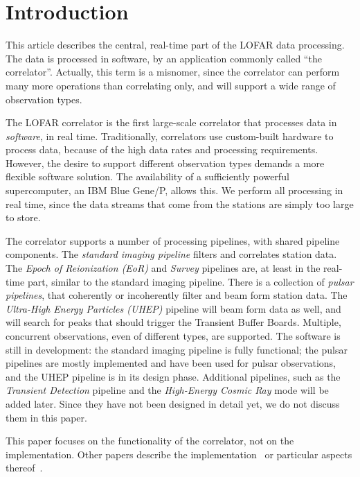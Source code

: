 \section{Introduction}

This article describes the central, real-time part of the LOFAR data
processing.
The data is processed in software, by an application commonly called
``the correlator''.
Actually, this term is a misnomer, since the correlator can perform many
more operations than correlating only, and will support a wide range of
observation types.

The LOFAR correlator is the first large-scale correlator that processes
data in \emph{software}, in real time.
Traditionally, correlators use custom-built hardware to process data, because
of the high data rates and processing requirements.
However, the desire to support different observation types demands a more
flexible software solution.
The availability of a sufficiently powerful supercomputer, an IBM Blue Gene/P,
allows this.
We perform all processing in real time, since the data streams
that come from the stations are simply too large to store.

The correlator supports a number of processing pipelines, with shared pipeline
components.
The \emph{standard imaging pipeline\/} filters and correlates station data.
The \emph{Epoch of Reionization (EoR)\/} and \emph{Survey\/} pipelines are,
at least in the real-time part, similar to the standard imaging pipeline.
There is a collection of \emph{pulsar pipelines}, that coherently or
incoherently filter and beam form station data.
The \emph{Ultra-High Energy Particles (UHEP)\/} pipeline will beam form data as
well, and will search for peaks that should trigger the Transient Buffer Boards.
Multiple, concurrent observations, even of different types, are supported.
The software is still in development: the standard imaging pipeline is fully
functional; the pulsar pipelines are mostly implemented and have been used for
pulsar observations, and the UHEP pipeline is in its design phase.
Additional pipelines, such as the \emph{Transient Detection\/} pipeline and
the \emph{High-Energy Cosmic Ray\/} mode will be added later.
Since they have not been designed in detail yet, we do not discuss them in
this paper.

This paper focuses on the functionality of the correlator, not on the
implementation.
Other papers describe the implementation~\cite{Romein:06,Romein:10a} or
particular aspects thereof~\cite{Iskra:08,Romein:09a,Kazutomo:10}.


